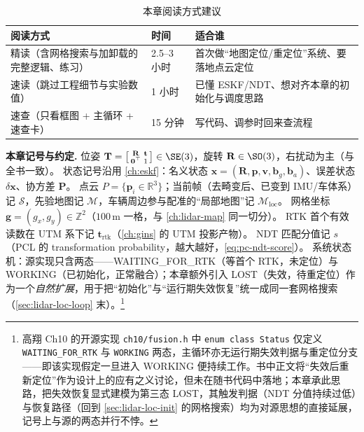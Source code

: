\begin{table}[H]\centering\small
\caption{本章阅读方式建议}
\label{tab:lidar-loc-reading}
\begin{tabular}{lll}
\toprule
阅读方式 & 时间 & 适合谁 \\
\midrule
精读（含网格搜索与加卸载的完整逻辑、练习） & 2.5--3 小时 & 首次做“地图定位/重定位”系统、要落地点云定位 \\
速读（跳过工程细节与实验数值） & 1 小时 & 已懂 ESKF/NDT、想对齐本章的初始化与调度思路 \\
速查（只看框图 + 主循环 + 速查卡） & 15 分钟 & 写代码、调参时回来查流程 \\
\bottomrule
\end{tabular}
\end{table}

\begin{note}
\textbf{本章记号与约定.}\;
位姿 $\mathbf T=\big[\begin{smallmatrix}\mathbf R&\mathbf t\\\mathbf 0^\top&1\end{smallmatrix}\big]\in\SE(3)$，旋转 $\mathbf R\in\SO(3)$，右扰动为主（与全书一致）。
状态记号沿用 \cref{ch:eskf}：名义状态 $\mathbf x=(\mathbf R,\mathbf p,\mathbf v,\mathbf b_g,\mathbf b_a)$、误差状态 $\delta\mathbf x$、协方差 $\mathbf P$。
点云 $P=\{\mathbf p_i\in\mathbb R^3\}$；当前帧（去畸变后、已变到 IMU/车体系）记 $\mathcal S$，先验地图记 $\mathcal M$，车辆周边参与配准的“局部地图”记 $\mathcal M_{\mathrm{loc}}$。
网格坐标 $\mathbf g=(g_x,g_y)\in\mathbb Z^2$（$100$\,m 一格，与 \cref{ch:lidar-map} 同一切分）。
RTK 首个有效读数在 UTM 系下记 $\mathbf t_{\mathrm{rtk}}$（\cref{ch:gins} 的 UTM 投影产物）。
NDT 匹配分值记 $s$（PCL 的 transformation probability，越大越好，\cref{eq:pc-ndt-score}）。
系统状态机：源实现只含两态——\textsf{WAITING\_FOR\_RTK}（等首个 RTK，未定位）与 \textsf{WORKING}（已初始化，正常融合）；本章额外引入 \textsf{LOST}（失效，待重定位）作为一个\emph{自然扩展}，用于把“初始化”与“运行期失效恢复”统一成同一套网格搜索（\cref{sec:lidar-loc-loop} 末）。\footnote{高翔 Ch10 的开源实现 \texttt{ch10/\allowbreak fusion.\allowbreak h} 中 \texttt{enum class Status} 仅定义 \texttt{WAITING\_FOR\_RTK} 与 \texttt{WORKING} 两态，主循环亦无运行期失效判据与重定位分支——即该实现假定一旦进入 \textsf{WORKING} 便持续工作。书中正文将“失效后重新定位”作为设计上的应有之义讨论，但未在随书代码中落地；本章承此思路，把失效恢复显式建模为第三态 \textsf{LOST}，其触发判据（NDT 分值持续过低）与恢复路径（回到 \cref{sec:lidar-loc-init} 的网格搜索）均为对源思想的直接延展，记号上与源的两态并行不悖。}
\end{note}

